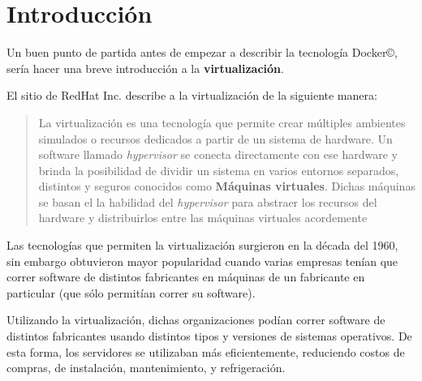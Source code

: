 \documentclass[14pt]{extarticle}
\newcommand{\docker}{Docker\copyright}
\begin{document}
    \clearpage
    \pagestyle{fancy}
    \cfoot{}
    \lfoot{\thepage}

    \clearpage
    \tableofcontents
    \clearpage

    \section{Introducción}
        Un buen punto de partida antes de empezar a describir la tecnología \docker{}, sería hacer una breve introducción a la \textbf{virtualización}.

        El sitio de RedHat Inc. describe a la virtualización de la siguiente manera:

        \begin{quote}
            La virtualización es una tecnología que permite crear múltiples ambientes simulados o recursos dedicados a partir de un sistema de hardware. Un software llamado \textit{hypervisor} se conecta directamente con ese hardware y brinda la posibilidad de dividir un sistema en varios entornos separados, distintos y seguros conocidos como \textbf{Máquinas virtuales}. Dichas máquinas se basan el la habilidad del \textit{hypervisor} para abstraer los recursos del hardware y distribuirlos entre las máquinas virtuales acordemente \cite{redhat}
        \end{quote}

        Las tecnologías que permiten la virtualización surgieron en la década del 1960, sin embargo obtuvieron mayor popularidad cuando varias empresas tenían que correr software de distintos fabricantes en máquinas de un fabricante en particular (que sólo permitían correr su software).
        
        Utilizando la virtualización, dichas organizaciones podían correr software de distintos fabricantes usando distintos tipos y versiones de sistemas operativos. De esta forma, los servidores se utilizaban más eficientemente, reduciendo costos de compras, de instalación, mantenimiento, y refrigeración.
\end{document}
